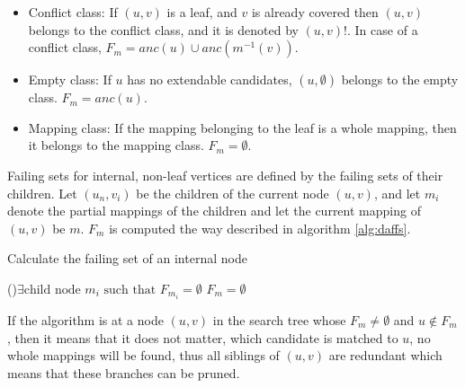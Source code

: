 \begin{itemize}
    \item Conflict class: If $(u, v)$ is a leaf, and $v$ is already covered then $(u, v)$ belongs to the conflict class, and it is denoted by $(u, v)!$. In case of a conflict class, $F_m = anc(u) \cup anc(m^{-1}(v))$.
    \item Empty class: If $u$ has no extendable candidates, $(u, \emptyset)$ belongs to the empty class. $F_m = anc(u)$.
    \item Mapping class: If the mapping belonging to the leaf is a whole mapping, then it belongs to the mapping class. $F_m = \emptyset$.
\end{itemize}

Failing sets for internal, non-leaf vertices are defined by the failing sets of their children. Let $(u_n, v_i)$ be the 
children of the current node $(u, v)$, and let $m_i$ denote the partial mappings of the children and let the current 
mapping of $(u, v)$ be $m$. $F_m$ is computed the way described in algorithm \ref{alg:daffs}.

\begin{algorithm}[h]
    \caption{Calculate the failing set of an internal node}
    \label{alg:daffs}    
    \SetAlgoLined\DontPrintSemicolon    
    \uIf(){$\exists \text{child node } m_i \text{ such that } F_{m_i} = \emptyset$}{
        \nl $F_m = \emptyset$\;
    }
\end{algorithm}

If the algorithm is at a node $(u, v)$ in the search tree whose $F_m \neq \emptyset$ and $u \notin F_m$, then it
means that it does not matter, which candidate is matched to $u$, no whole mappings will be found, thus all siblings
of $(u, v)$ are redundant which means that these branches can be pruned.

